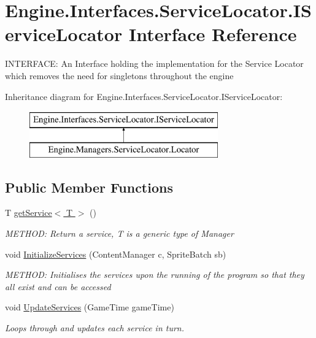 \hypertarget{a00474}{}\section{Engine.\+Interfaces.\+Service\+Locator.\+I\+Service\+Locator Interface Reference}
\label{a00474}


I\+N\+T\+E\+R\+F\+A\+CE\+: An Interface holding the implementation for the Service Locator which removes the need for singletons throughout the engine  


Inheritance diagram for Engine.\+Interfaces.\+Service\+Locator.\+I\+Service\+Locator\+:\begin{figure}[H]
\begin{center}
\leavevmode
\includegraphics[height=2.000000cm]{d5/d26/a00474}
\end{center}
\end{figure}
\subsection*{Public Member Functions}
\begin{DoxyCompactItemize}
\item 
T \hyperlink{a00474_a39ce84b8fb97655fd7039be3c4fa5f1c}{get\+Service$<$ T $>$} ()
\begin{DoxyCompactList}\small\item\em M\+E\+T\+H\+OD\+: Return a service, T is a generic type of Manager \end{DoxyCompactList}\item 
void \hyperlink{a00474_a4bf9f6979adf99eda26320a420262991}{Initialize\+Services} (Content\+Manager c, Sprite\+Batch sb)
\begin{DoxyCompactList}\small\item\em M\+E\+T\+H\+OD\+: Initialises the services upon the running of the program so that they all exist and can be accessed \end{DoxyCompactList}\item 
void \hyperlink{a00474_a5bf3aab2adcf14c813a348325003ddcc}{Update\+Services} (Game\+Time game\+Time)
\begin{DoxyCompactList}\small\item\em Loops through and updates each service in turn. \end{DoxyCompactList}\end{DoxyCompactItemize}


